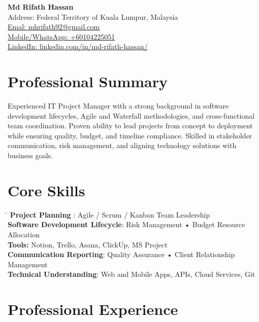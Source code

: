 \documentclass[a4paper,10pt]{article}
\begin{document}
\begin{center}
    {\LARGE \textbf{Md Rifath Hassan}} \\
    \vspace{2mm}
    Address: Federal Territory of Kuala Lumpur, Malaysia \\
    \href{mailto:mhrifath92@gmail.com}{Emal: mhrifath92@gmail.com} \\
    \href{tel:+60104225051}{Mobile/WhatsApp: +60104225051} \\
    \href{https://www.linkedin.com/in/md-rifath-hassan/}{LinkedIn: linkedin.com/in/md-rifath-hassan/} \quad

    \vspace{1mm}
\end{center}

\section*{Professional Summary}
Experienced IT Project Manager with a strong background in software development lifecycles, Agile and Waterfall methodologies, and cross-functional team coordination. Proven ability to lead projects from concept to deployment while ensuring quality, budget, and timeline compliance. Skilled in stakeholder communication, risk management, and aligning technology solutions with business goals.

\section*{Core Skills}
\begin{tabbing}
\hspace{3cm} \= \kill
\textbf{Project Planning}\> : Agile / Scrum / Kanban Team Leadership \\
\textbf{Software Development Lifecycle}: Risk Management • Budget Resource Allocation  \\
\textbf{Tools:} \> Notion, Trello, Asana, ClickUp, MS Project \\
\textbf{Communication Reporting}: Quality Assurance • Client Relationship Management  \\
\textbf{Technical Understanding}: Web and Mobile Apps, APIs, Cloud Services, Git  \\

\end{tabbing}

\section*{Professional Experience}
\end{document}
